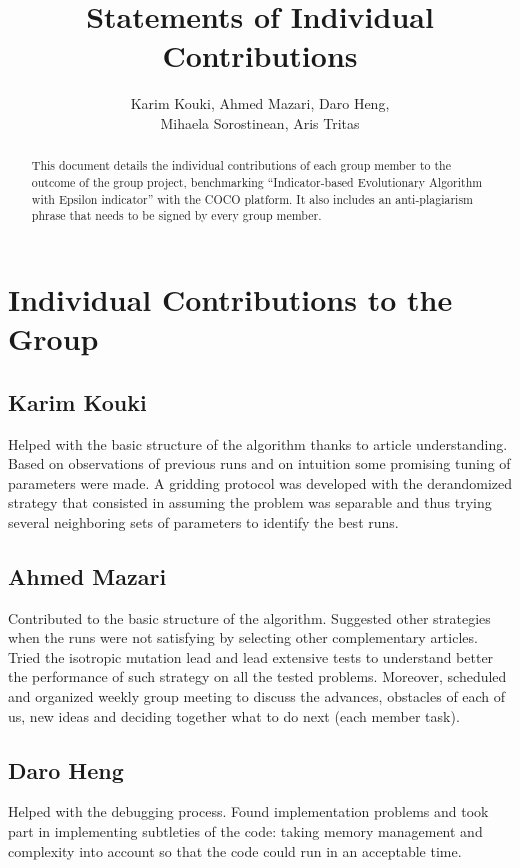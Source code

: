 \documentclass{article}
\begin{document}
\title{Statements of Individual Contributions}
\author{Karim Kouki, Ahmed Mazari, Daro Heng, \\ Mihaela Sorostinean, Aris Tritas}
\maketitle
\begin{abstract}
This document details the individual contributions of each group member to the outcome of the group project, benchmarking ``Indicator-based Evolutionary Algorithm with Epsilon indicator'' with the COCO platform. It also includes an anti-plagiarism phrase that needs to be signed by every group member.
\end{abstract}


\section{Individual Contributions to the Group}

\subsection*{Karim Kouki}
Helped with the basic structure of the algorithm thanks to article understanding. 
Based on observations of previous runs and on intuition some promising tuning of parameters were made. 
A gridding protocol was developed with the derandomized strategy that consisted in assuming the problem was separable and thus trying several neighboring sets of parameters to identify the best runs.

\subsection*{Ahmed Mazari}
Contributed to the basic structure of the algorithm. 
Suggested other strategies when the runs were not satisfying by selecting other complementary articles. 
Tried the isotropic mutation lead and lead extensive tests to understand better the performance of such strategy on all the tested problems. 
Moreover, scheduled and organized weekly group meeting to discuss the advances, obstacles of each of us, new ideas and deciding together what to do next (each member task).

\subsection*{Daro Heng}
Helped with the debugging process. 
Found implementation problems and took part in implementing subtleties of the code: taking memory management and complexity into account so that the code could run in an acceptable time.
\end{document}
